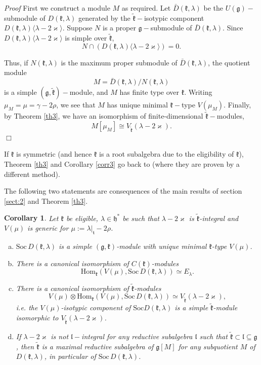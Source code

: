 \documentclass[10pt]{amsart}
\newtheorem{cor}[theo]{Corollary}
\renewenvironment{proof}{ \emph{Proof}}{$\Box$}
\newcommand{\Soc}{\mathrm{Soc}}
\newcommand{\Hom}{\mathrm{Hom}}
\renewcommand{\gg}{\mathfrak{g}}
\newcommand{\hh}{\mathfrak{h}}
\newcommand{\kk}{\mathfrak{k}}
\renewcommand{\ll}{\mathfrak{l}}
\renewcommand{\tt}{\mathfrak{t}}
\begin{document}
\begin{proof}
First we construct a module $M$ as required. Let $\bar{D}(\kk,\lambda)$ be the $U(\gg)-$submodule of $D(\kk,\lambda)$ generated by the $\tilde{\kk}-$isotypic component $D(\kk,\lambda)\langle\lambda-2\varkappa\rangle$. Suppose $N$ is a proper $\gg-$submodule of $\bar{D}(\kk,\lambda)$. Since $D(\kk,\lambda)\langle\lambda-2\varkappa\rangle$ is simple over $\tilde{\kk}$,
$$N \cap (D(\kk,\lambda)\langle\lambda-2\varkappa\rangle) = 0.$$

Thus, if $N(\kk,\lambda)$ is the maximum proper submodule of $\bar{D}(\kk,\lambda)$, the quotient module 
$$M = \bar{D}(\kk,\lambda)/N(\kk,\lambda)$$
is a simple $(\gg,\tilde{\kk})-$module, and $M$ has finite type over $\kk$. Writing $\mu_M = \mu = \gamma-2\rho$, we see that $M$ has unique minimal $\kk-$type $V(\mu_M)$. Finally, by Theorem \ref{th3}, we have an isomorphism of finite-dimensional $\tilde{\kk}-$modules,
$$M[\mu_M] \cong V_{\tilde{\kk}}(\lambda-2\varkappa).$$ 
\end{proof}


If $\kk$ is symmetric (and hence $\kk$ is a root subalgebra due to the eligibility of $\kk$), Theorem \ref{th3} and Corollary \ref{corr3} go back to \cite{V} (where they are proven by a different method).

The following two statements are consequences of the main results of section \ref{sect:2} and Theorem \ref{th3}.

\begin{cor}\label{corr:8}
    Let $\kk$ be eligible, $\lambda\in\hh^*$ be such that $\lambda-2\varkappa$ is $\tilde{\kk}$-integral and $V(\mu)$ is generic for $\mu:= \lambda|_{\tt}-2\rho$.
	\begin{enumerate}[a)]
	    \item $\Soc\,D(\kk,\lambda)$ is a simple $(\gg,\kk)$-module with unique minimal $\kk$-type $V(\mu)$.
		\item There is a canonical isomorphism of $C(\kk)$-modules
		$$\Hom_\kk(V(\mu),\Soc\,D(\kk,\lambda))\simeq E_\lambda.$$
		\item There is a canonical isomorphism of $\tilde{\kk}$-modules
		$$V(\mu)\otimes\Hom_\kk(V(\mu),\Soc\,D(\kk,\lambda))\simeq V_{\tilde{\kk}}(\lambda-2\varkappa),$$
		i.e. the $V(\mu)$-isotypic component of $\Soc D(\kk,\lambda)$ is a simple $\tilde{\kk}$-module isomorphic to $V_{\tilde{\kk}}(\lambda-2\varkappa)$.
		\item If $\lambda-2\varkappa$ is not $\ll-$integral for any reductive subalgebra $\ll$ such that $\tilde{\kk} \subset \ll \subseteq \gg$, then $\tilde{\kk}$ is a maximal reductive subalgebra of $\gg[M]$ for any subquotient $M$ of $D(\kk,\lambda)$, in particular of $\Soc\,D(\kk,\lambda)$.
	\end{enumerate}
\end{cor}
\end{document}
